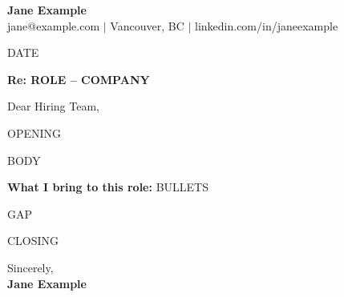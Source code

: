 \documentclass[11pt]{article}
\begin{document}
\begin{center}
    {\LARGE \textbf{Jane Example}}\\[2pt]
    jane@example.com $|$ Vancouver, BC $|$ linkedin.com/in/janeexample
\end{center}
\vspace{0.6em}
{{DATE}}

\textbf{Re: {{ROLE}} -- {{COMPANY}}}

Dear Hiring Team,

{{OPENING}}

{{BODY}}

\textbf{What I bring to this role:}
{{BULLETS}}

{{GAP}}

{{CLOSING}}

Sincerely,\\
\textbf{Jane Example}
\end{document}
